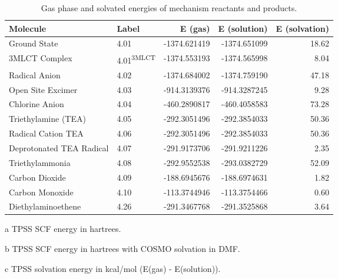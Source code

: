 \begin{table}[!htb]
\centering
 \begin{threeparttable}
  \caption[Gas phase and solvated energies for mechanism reactants and products]{Gas phase and solvated energies of mechanism reactants and products.}
    \begin{tabular}{llrrr}
    \toprule
    Molecule & Label & E (gas)\tnote{a} & E (solution)\tnote{b} & E (solvation)\tnote{c} \\
    \midrule
    Ground State & 4.01 & -1374.621419 & -1374.651099 & 18.62 \\
    3MLCT Complex & 4.01\textsuperscript{3MLCT} & -1374.553193 & -1374.565998 & 8.04 \\
    Radical Anion & 4.02 & -1374.684002 & -1374.759190 & 47.18 \\
    Open Site Excimer & 4.03 & -914.3139376 & -914.3287245 & 9.28 \\
    Chlorine Anion & 4.04  & -460.2890817 & -460.4058583 & 73.28 \\
    Triethylamine (TEA) & 4.05  & -292.3051496 & -292.3854033 & 50.36 \\
    Radical Cation TEA & 4.06  & -292.3051496 & -292.3854033 & 50.36 \\
    Deprotonated TEA Radical & 4.07  & -291.9173706 & -291.9211226 & 2.35 \\
    Triethylammonia & 4.08  & -292.9552538 & -293.0382729 & 52.09 \\
    Carbon Dioxide & 4.09  & -188.6945676 & -188.6974631 & 1.82 \\
    Carbon Monoxide & 4.10  & -113.3744946 & -113.3754466 & 0.60 \\
    Diethylaminoethene & 4.26  & -291.3467768 & -291.3525868 & 3.64 \\
    \bottomrule
    \end{tabular}%
    \begin{tablenotes}
    \item [a] TPSS SCF energy in hartrees.
    \item [b] TPSS SCF energy in hartrees with COSMO solvation in DMF.
    \item [c] TPSS solvation energy in kcal/mol (E(gas) - E(solution)).
    \end{tablenotes}
  \label{tab.supenergy}%
 \end{threeparttable}
\end{table}%


